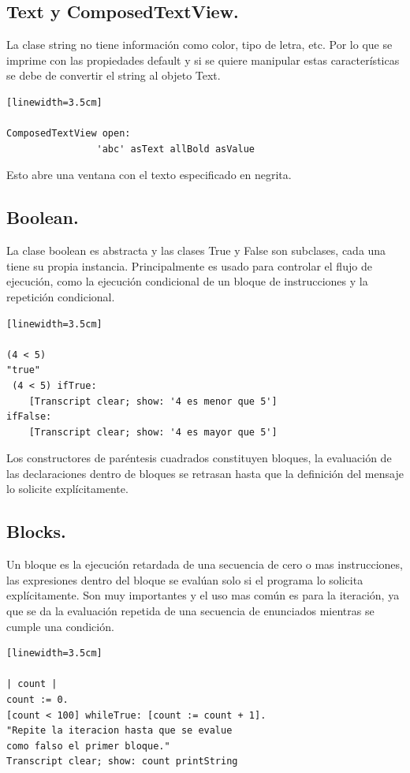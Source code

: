 \documentclass[10pt,journal,compsoc]{IEEEtran}
\begin{document}
\subsection{Text y ComposedTextView.}
La clase string no tiene informaci\'on como color, tipo de letra, etc. Por lo que se imprime con las propiedades default y si se quiere manipular estas caracter\'isticas se debe de convertir el string al objeto Text.
\begin{lstlisting}[language=Smalltalk, caption = {Ejemplo de uso.}][linewidth=3.5cm]

ComposedTextView open: 
				'abc' asText allBold asValue

\end{lstlisting}
Esto abre una ventana con el texto especificado en negrita.

\subsection{Boolean.}
La clase boolean es abstracta y las clases True y False son subclases, cada una tiene su propia instancia. Principalmente es usado para controlar el flujo de ejecuci\'on, como la ejecuci\'on condicional de un bloque de instrucciones y la repetici\'on condicional.
\begin{lstlisting}[language=Smalltalk, caption = {Ejemplo de uso.}][linewidth=3.5cm]

(4 < 5)                     
"true"
 (4 < 5) ifTrue: 
 	[Transcript clear; show: '4 es menor que 5']                    
ifFalse: 
	[Transcript clear; show: '4 es mayor que 5']

\end{lstlisting}
Los constructores de par\'entesis cuadrados constituyen bloques, la evaluaci\'on de las declaraciones dentro de bloques se retrasan hasta que la definici\'on del mensaje lo solicite expl\'icitamente.

\subsection{Blocks.}
Un bloque es la ejecuci\'on retardada de una secuencia de cero o mas instrucciones, las expresiones dentro del bloque se eval\'uan solo si el programa lo solicita expl\'icitamente.
Son muy importantes y el uso mas com\'un es para la iteraci\'on, ya que se da la evaluaci\'on repetida de una secuencia de enunciados mientras se cumple una condici\'on.

\begin{lstlisting}[language=Smalltalk, caption = {Ejemplo de uso.}][linewidth=3.5cm]

| count |
count := 0.
[count < 100] whileTrue: [count := count + 1].         
"Repite la iteracion hasta que se evalue 
como falso el primer bloque."
Transcript clear; show: count printString          

\end{lstlisting}
\end{document}

